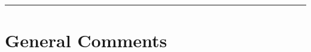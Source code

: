 \documentclass{exam}
\title{}
\date{}
\begin{document}
\maketitle
\rule{\textwidth}{0.15em}
\fontsize{12}{15}\selectfont
\thispagestyle{empty}


\section{General Comments}


\clearpage 



\end{document}
